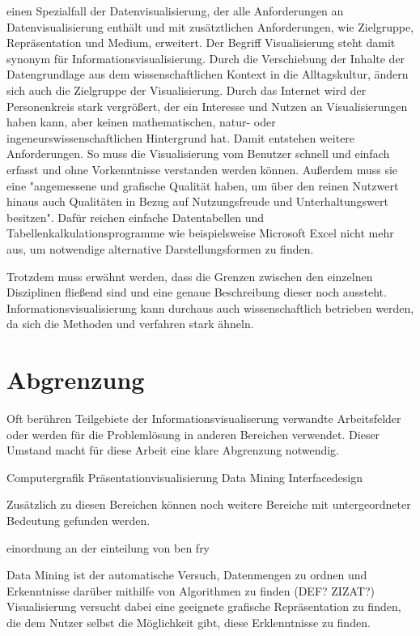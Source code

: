 \documentclass[a4paper, 12pt, onepage, pdftex, headsepline, footsepline]{scrreprt}
\begin{document}
einen Spezialfall der Datenvisualisierung, der alle Anforderungen an Datenvisualisierung enthält
und mit zusätztlichen Anforderungen, wie Zielgruppe, Repräsentation und Medium, erweitert.
Der Begriff Visualisierung steht damit synonym für Informationsvisualisierung.
Durch die Verschiebung der Inhalte der Datengrundlage aus dem wissenschaftlichen Kontext
in die Alltagskultur, ändern sich auch die Zielgruppe der Visualisierung. Durch das Internet
wird der Personenkreis stark vergrößert, der ein Interesse und Nutzen an Visualisierungen
haben kann, aber keinen mathematischen, natur- oder ingeneurswissenschaftlichen Hintergrund
hat. Damit entstehen weitere Anforderungen. So muss die Visualisierung vom Benutzer
schnell und einfach erfasst und ohne Vorkenntnisse verstanden werden können.
Außerdem muss sie eine "angemessene und grafische Qualität haben, um über den
reinen Nutzwert hinaus auch Qualitäten in Bezug auf Nutzungsfreude und Unterhaltungswert besitzen".\citep[S.\,438]{Preim}
Dafür reichen einfache Datentabellen und Tabellenkalkulationsprogramme wie beispielsweise Microsoft Excel
nicht mehr aus, um notwendige alternative Darstellungsformen zu finden.

Trotzdem muss erwähnt werden, dass die Grenzen zwischen den einzelnen Disziplinen fließend sind
und eine genaue Beschreibung dieser noch aussteht. Informationsvisualisierung kann durchaus
auch wissenschaftlich betrieben werden, da sich die Methoden und verfahren stark ähneln.

\section{Abgrenzung}

Oft berühren Teilgebiete der Informationsvisualiserung verwandte Arbeitsfelder oder werden für die Problemlösung
in anderen Bereichen verwendet. Dieser Umstand macht für diese Arbeit eine klare Abgrenzung notwendig.



Computergrafik
Präsentationvisualisierung
Data Mining
Interfacedesign

Zusätzlich zu diesen Bereichen können noch weitere Bereiche mit untergeordneter Bedeutung gefunden werden.

einordnung an der einteilung von ben fry


Data Mining ist der automatische Versuch, Datenmengen zu ordnen und Erkenntnisse darüber mithilfe von Algorithmen zu finden (DEF? ZIZAT?)
Visualisierung versucht dabei eine geeignete grafische Repräsentation zu finden, die dem Nutzer selbst die Möglichkeit gibt,
diese Erklenntnisse zu finden.
\end{document}
